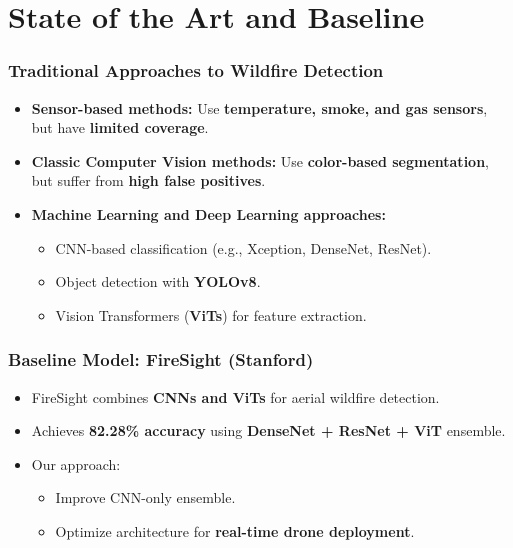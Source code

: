 \section{State of the Art and Baseline}
\label{sec:baseline}

\begin{frame}
    \frametitle{Traditional Approaches to Wildfire Detection}
    \begin{itemize}
        \item \textbf{Sensor-based methods:} Use \textbf{temperature, smoke, and gas sensors}, but have \textbf{limited coverage}.
        \item \textbf{Classic Computer Vision methods:} Use \textbf{color-based segmentation}, but suffer from \textbf{high false positives}.
        \item \textbf{Machine Learning and Deep Learning approaches:}
            \begin{itemize}
                \item CNN-based classification (e.g., Xception, DenseNet, ResNet).
                \item Object detection with \textbf{YOLOv8}.
                \item Vision Transformers (\textbf{ViTs}) for feature extraction.
            \end{itemize}
    \end{itemize}
\end{frame}

\begin{frame}
    \frametitle{Baseline Model: FireSight (Stanford)}
    \begin{itemize}
        \item FireSight combines \textbf{CNNs and ViTs} for aerial wildfire detection.
        \item Achieves \textbf{82.28\% accuracy} using \textbf{DenseNet + ResNet + ViT} ensemble.
        \item Our approach:
            \begin{itemize}
                \item Improve CNN-only ensemble.
                \item Optimize architecture for \textbf{real-time drone deployment}.
            \end{itemize}
    \end{itemize}
\end{frame}
